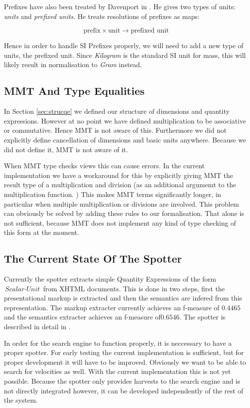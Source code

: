 Prefixes have also been treated by Davenport in \cite{SD:UnitKnowledgeMgmt08}. He gives two types of units: \textit{units} and \textit{prefixed units}. He treats resolutions of prefixes as maps:

\[\text{prefix} \times \text{unit} \rightarrow \text{prefixed unit}\]

Hence in order to handle SI Prefixes properly, we will need to add a new type of units, the prefixed unit. Since \textit{Kilogram} is the standard SI unit for mass, this will likely result in normalisation to \textit{Gram} instead.
\subsection{MMT And Type Equalities}

In Section \ref{sec:strucqe} we defined our structure of dimensions and quantity expressions. However at no point we have defined multiplication to be associative or commutative. Hence MMT is not aware of this. Furthermore we did not explicitly define cancellation of dimensions and basic units anywhere. Because we did not define it, MMT is not aware of it.

When MMT type checks views this can cause errors. In the current implementation we have a workaround for this by explicitly giving MMT the result type of a multiplication and division (as an additional argumemt to the multiplication function. ) This makes MMT terms significantly longer, in particular when multiple multiplication or divisions are involved.  This problem can obviously be solved by adding these rules to our formalisation. That alone is not sufficient, because MMT does not implement any kind of type checking of this form at the moment.

\subsection{The Current State Of The Spotter}

Currently the spotter extracts simple Quantity Expressions of the form $\textit{Scalar} \cdot{} \textit{Unit}$ from XHTML documents. This is done in two steps, first the presentational markup is extracted and then the semantics are infered from this representation. The markup extracter currently achieves an f-measure of $0.4465$ and the semantics extracter achieves an f-measure of$0.6546$. The spotter is described in detail in \cite{thesis:sharko}.

In order for the search engine to function properly, it is neccessary to have a proper spotter. For early testing the current implementation is sufficient, but for proper development it will have to be improved. Obviously we want to be able to search for velocities as well. With the current implementation this is not yet possible. Because the spotter only provides harvests to the search engine and is not directly integrated however, it can be developed independently of the rest of the system.

